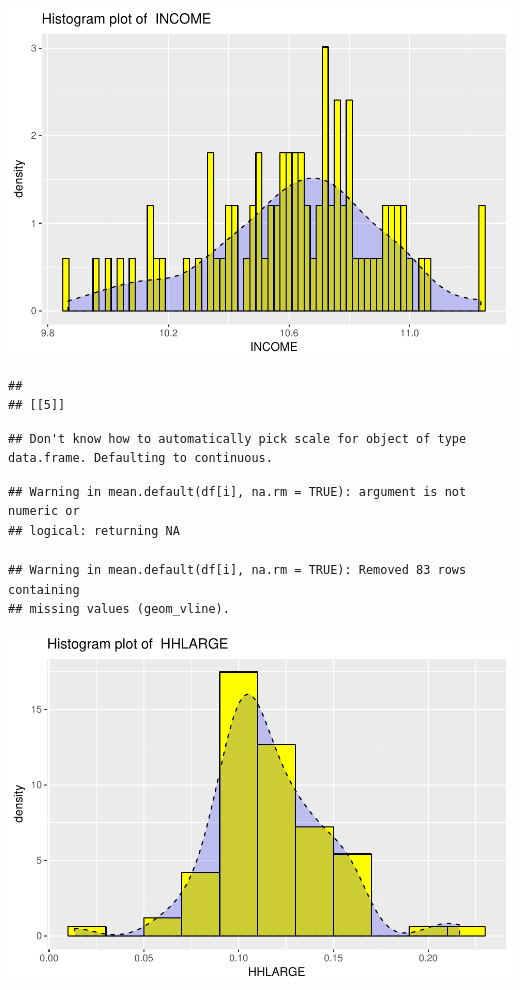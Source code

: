 \documentclass[]{article}
\begin{document}
\includegraphics{Desc_stats_files/figure-latex/unnamed-chunk-2-4.pdf}

\begin{verbatim}
## 
## [[5]]
\end{verbatim}

\begin{verbatim}
## Don't know how to automatically pick scale for object of type data.frame. Defaulting to continuous.
\end{verbatim}

\begin{verbatim}
## Warning in mean.default(df[i], na.rm = TRUE): argument is not numeric or
## logical: returning NA

## Warning in mean.default(df[i], na.rm = TRUE): Removed 83 rows containing
## missing values (geom_vline).
\end{verbatim}

\includegraphics{Desc_stats_files/figure-latex/unnamed-chunk-2-5.pdf}
\end{document}
